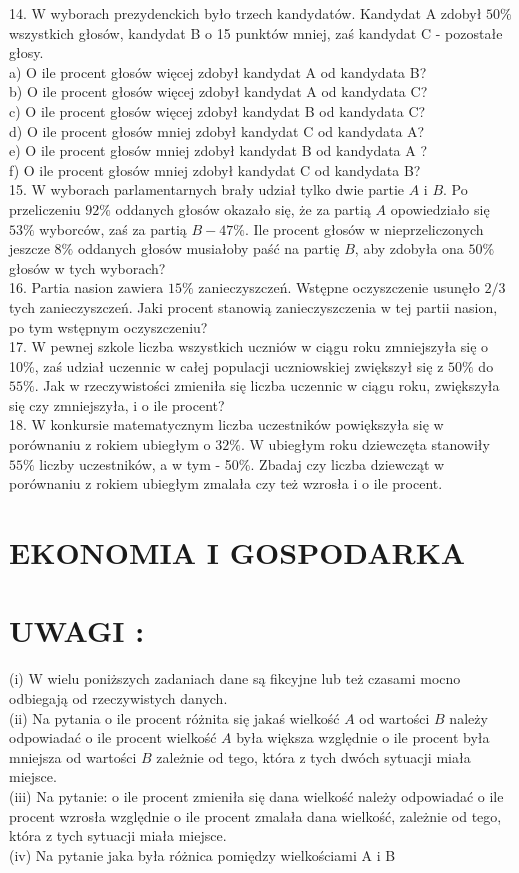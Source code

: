 \documentclass[10pt]{article}
\begin{document}
14. W wyborach prezydenckich było trzech kandydatów. Kandydat A zdobył \(50 \%\) wszystkich głosów, kandydat B o 15 punktów mniej, zaś kandydat C - pozostałe głosy.\\
a) O ile procent głosów więcej zdobył kandydat A od kandydata B?\\
b) O ile procent głosów więcej zdobył kandydat A od kandydata C?\\
c) O ile procent głosów więcej zdobył kandydat B od kandydata C?\\
d) O ile procent głosów mniej zdobył kandydat C od kandydata A?\\
e) O ile procent głosów mniej zdobył kandydat B od kandydata A ?\\
f) O ile procent głosów mniej zdobył kandydat C od kandydata B?\\
15. W wyborach parlamentarnych brały udział tylko dwie partie \(A\) i \(B\). Po przeliczeniu \(92 \%\) oddanych głosów okazało się, że za partią \(A\) opowiedziało się \(53 \%\) wyborców, zaś za partią \(B-47 \%\). Ile procent głosów w nieprzeliczonych jeszcze \(8 \%\) oddanych głosów musiałoby paść na partię \(B\), aby zdobyła ona \(50 \%\) głosów w tych wyborach?\\
16. Partia nasion zawiera \(15 \%\) zanieczyszczeń. Wstępne oczyszczenie usunęło \(2 / 3\) tych zanieczyszczeń. Jaki procent stanowią zanieczyszczenia w tej partii nasion, po tym wstępnym oczyszczeniu?\\
17. W pewnej szkole liczba wszystkich uczniów w ciągu roku zmniejszyła się o 10\%, zaś udział uczennic w całej populacji uczniowskiej zwiększył się z \(50 \%\) do \(55 \%\). Jak w rzeczywistości zmieniła się liczba uczennic w ciągu roku, zwiększyła się czy zmniejszyła, i o ile procent?\\
18. W konkursie matematycznym liczba uczestników powiększyła się w porównaniu z rokiem ubiegłym o \(32 \%\). W ubiegłym roku dziewczęta stanowiły \(55 \%\) liczby uczestników, a w tym - 50\%. Zbadaj czy liczba dziewcząt w porównaniu z rokiem ubiegłym zmalała czy też wzrosła i o ile procent.

\section*{EKONOMIA I GOSPODARKA}
\section*{UWAGI :}
(i) W wielu poniższych zadaniach dane są fikcyjne lub też czasami mocno odbiegają od rzeczywistych danych.\\
(ii) Na pytania o ile procent różnita się jakaś wielkość \(A\) od wartości \(B\) należy odpowiadać o ile procent wielkość \(A\) była większa względnie o ile procent była mniejsza od wartości \(B\) zależnie od tego, która z tych dwóch sytuacji miała miejsce.\\
(iii) Na pytanie: o ile procent zmieniła się dana wielkość należy odpowiadać o ile procent wzrosła względnie o ile procent zmalała dana wielkość, zależnie od tego, która z tych sytuacji miała miejsce.\\
(iv) Na pytanie jaka była różnica pomiędzy wielkościami A i B
\end{document}
